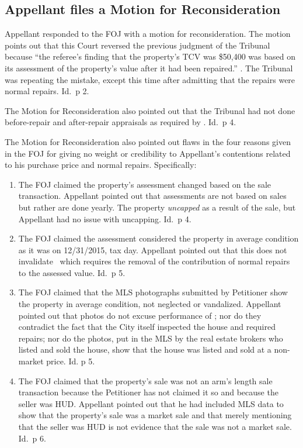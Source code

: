 \documentclass[12pt,\documentclassflag]{michiganCourtOfAppealsBrief}
\begin{document}
\subsection{Appellant files a Motion for Reconsideration}

Appellant responded to the FOJ with a motion for reconsideration. The motion points out that this Court reversed the previous judgment of the Tribunal because  ``the referee's finding that the property's TCV was \$50,400 was based on its assessment of the property's value after it had been repaired.'' \motionForReconsideration[1]. The Tribunal was repeating the mistake, except this time after admitting that the repairs were normal repairs. Id.\ p 2. 

The Motion for Reconsideration also pointed out that the Tribunal had not done before-repair and after-repair appraisals as required by \mathieuGast. Id.\ p 4.

The Motion for Reconsideration also pointed out flaws in the four reasons given in the FOJ for giving no weight or credibility to Appellant's contentions related to his purchase price and normal repairs. Specifically:

\begin{enumerate}
\item The FOJ claimed the property's assessment changed based on the sale transaction. Appellant pointed out that assessments are not based on sales but rather are done yearly. The property \emph{uncapped} as a result of the sale, but Appellant had no issue with uncapping. Id.\ p 4.

\item The FOJ claimed the assessment considered the property in average condition as it was on 12/31/2015, tax day. Appellant pointed out that this does not invalidate \mathieuGast\ which requires the removal of the contribution of normal repairs to the assessed value. Id.\ p 5. 

\item The FOJ claimed that the MLS photographs submitted by Petitioner show the property in average condition, not neglected or vandalized. Appellant pointed out that photos do not excuse performance of \mathieuGast; nor do they contradict the fact that the City itself inspected the house and required repairs; nor do the photos, put in the MLS by the real estate brokers who listed and sold the house, show that the house was listed and sold at a non-market price. Id. p 5.
  
\item The FOJ claimed that the property's sale was not an arm's length sale transaction because the Petitioner has not claimed it so and because the seller was HUD. Appellant pointed out that he had included MLS data to show that the property's sale was a market sale and that merely mentioning that the seller was HUD is not evidence that the sale was not a market sale. Id.\ p 6.
\end{enumerate}
\end{document}
